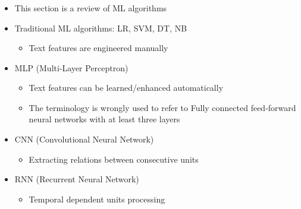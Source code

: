 \documentclass[xcolor=table]{beamer}
\begin{document}
\begin{frame}
	\frametitle{\insertshortsubtitle}
	\framesubtitle{\insertsection}
	
	\begin{itemize}
		\item This section is a review of ML algorithms
		\item Traditional ML algorithms: LR, SVM, DT, NB
		\begin{itemize}
			\item Text features are engineered manually
		\end{itemize}
		\item MLP (Multi-Layer Perceptron)
		\begin{itemize}
			\item Text features can be learned/enhanced automatically
			\item The terminology is wrongly used to refer to Fully connected feed-forward neural networks with at least three layers
		\end{itemize}
		\item CNN (Convolutional Neural Network)
		\begin{itemize}
			\item Extracting relations between consecutive units
		\end{itemize}
		\item RNN (Recurrent Neural Network)
		\begin{itemize}
			\item Temporal dependent units processing
		\end{itemize}
	\end{itemize}
	
\end{frame}
\end{document}
